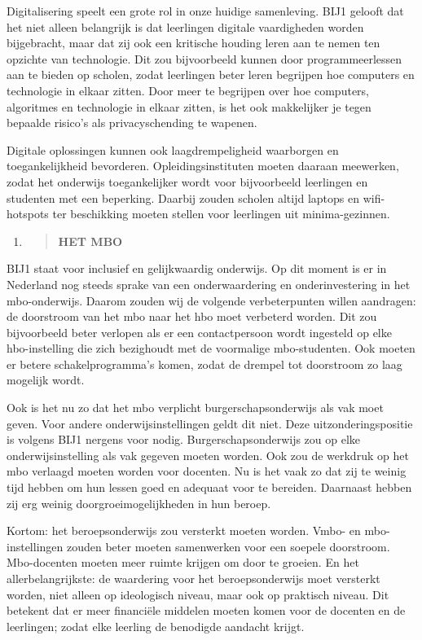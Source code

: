Digitalisering speelt een grote rol in onze huidige samenleving. BIJ1
gelooft dat het niet alleen belangrijk is dat leerlingen digitale
vaardigheden worden bijgebracht, maar dat zij ook een kritische houding
leren aan te nemen ten opzichte van technologie. Dit zou bijvoorbeeld
kunnen door programmeerlessen aan te bieden op scholen, zodat leerlingen
beter leren begrijpen hoe computers en technologie in elkaar zitten.
Door meer te begrijpen over hoe computers, algoritmes en technologie in
elkaar zitten, is het ook makkelijker je tegen bepaalde risico's als
privacyschending te wapenen.

Digitale oplossingen kunnen ook laagdrempeligheid waarborgen en
toegankelijkheid bevorderen. Opleidingsinstituten moeten daaraan
meewerken, zodat het onderwijs toegankelijker wordt voor bijvoorbeeld
leerlingen en studenten met een beperking. Daarbij zouden scholen altijd
laptops en wifi-hotspots ter beschikking moeten stellen voor leerlingen
uit minima-gezinnen.

\begin{enumerate}
\def\labelenumi{\arabic{enumi}.}
\setcounter{enumi}{8}
\item
  \begin{quote}
  \textbf{HET MBO}
  \end{quote}
\end{enumerate}

BIJ1 staat voor inclusief en gelijkwaardig onderwijs. Op dit moment is
er in Nederland nog steeds sprake van een onderwaardering en
onderinvestering in het mbo-onderwijs. Daarom zouden wij de volgende
verbeterpunten willen aandragen: de doorstroom van het mbo naar het hbo
moet verbeterd worden. Dit zou bijvoorbeeld beter verlopen als er een
contactpersoon wordt ingesteld op elke hbo-instelling die zich
bezighoudt met de voormalige mbo-studenten. Ook moeten er betere
schakelprogramma's komen, zodat de drempel tot doorstroom zo laag
mogelijk wordt.

Ook is het nu zo dat het mbo verplicht burgerschapsonderwijs als vak
moet geven. Voor andere onderwijsinstellingen geldt dit niet. Deze
uitzonderingspositie is volgens BIJ1 nergens voor nodig.
Burgerschapsonderwijs zou op elke onderwijsinstelling als vak gegeven
moeten worden. Ook zou de werkdruk op het mbo verlaagd moeten worden
voor docenten. Nu is het vaak zo dat zij te weinig tijd hebben om hun
lessen goed en adequaat voor te bereiden. Daarnaast hebben zij erg
weinig doorgroeimogelijkheden in hun beroep.

Kortom: het beroepsonderwijs zou versterkt moeten worden. Vmbo- en
mbo-instellingen zouden beter moeten samenwerken voor een soepele
doorstroom. Mbo-docenten moeten meer ruimte krijgen om door te groeien.
En het allerbelangrijkste: de waardering voor het beroepsonderwijs moet
versterkt worden, niet alleen op ideologisch niveau, maar ook op
praktisch niveau. Dit betekent dat er meer financiële middelen moeten
komen voor de docenten en de leerlingen; zodat elke leerling de
benodigde aandacht krijgt.

